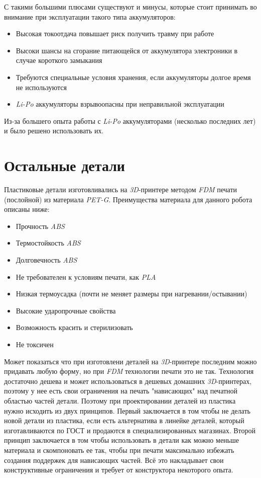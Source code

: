 С такими большими плюсами существуют и минусы, которые стоит принимать во внимание при эксплуатации такого типа аккумуляторов:
\begin{itemize}
    \item Высокая токоотдача повышает риск получить травму при работе
    \item Высоки шансы на сгорание питающейся от аккумулятора электроники в случае короткого замыкания
    \item Требуются специальные условия хранения, если аккумуляторы долгое время не используются
    \item \textit{Li-Po} аккумуляторы взрывоопасны при неправильной эксплуатации
\end{itemize}

Из-за большего опыта работы с \textit{Li-Po} аккумуляторами (несколько последних лет) и было решено использовать их. 



\section{Остальные детали}
Пластиковые детали изготовливались на \textit{3D}-принтере методом \textit{FDM} печати (послойной) из материала \textit{PET-G}. Преимущества материала для данного робота описаны ниже:
\begin{itemize}
    \item Прочность \textit{ABS}
    \item Термостойкость \textit{ABS}
    \item Долговечность \textit{ABS}
    \item Не требователен к условиям печати, как \textit{PLA}
    \item Низкая термоусадка (почти не меняет размеры при нагревании/остывании)
    \item Высокие ударопрочные свойства
    \item Возможность красить и стерилизовать
    \item Не токсичен
\end{itemize}

Может показаться что при изготовлени деталей на \textit{3D}-принтере последним можно придавать любую форму, но при \textit{FDM} технологии печати это не так. Технология достаточно дешева и может использоваться в дешевых домашних \textit{3D}-принтерах, поэтому у нее есть свои ограничения на печать "нависающих" над печатной областью частей детали. Поэтому при проектировании деталей из пластика нужно исходить из двух принципов. Первый заключается в том чтобы не делать новой детали из пластика, если есть альтернатива в линейке деталей, который изготавливаются по ГОСТ и продаются в специализированных магазинах. Второй принцип заключается в том чтобы использовать в детали как можно меньше материала и скомпоновать ее так, чтобы при печати максимально избежать создания поддержек для нависающих частей. Всё это накладывает свои конструктивные ограничения и требует от конструктора некоторого опыта.

